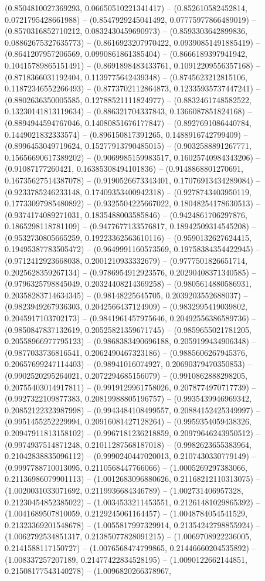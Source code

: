 (0.8504810027369293, 0.06650510221341417) -- (0.852610582452814, 0.0721795428661988) -- (0.8547929245041492, 0.07775977866489019) -- (0.8570316852710212, 0.0832430459690973) -- (0.8593303642899836, 0.08862675327635773) -- (0.8616923207970422, 0.09390851491885419) -- (0.8641207957206569, 0.0990861861385404) -- (0.8666189397941942, 0.10415789865151491) -- (0.8691898483433761, 0.10912209556357168) -- (0.8718366031192404, 0.1139775642439348) -- (0.8745623212815106, 0.11872346552266493) -- (0.8773702112864873, 0.12335935737447241) -- (0.8802636350005585, 0.12788521111824977) -- (0.8832461748582522, 0.13230141813119634) -- (0.886321704337843, 0.1366087851824168) -- (0.8894944594767046, 0.14080851676177847) -- (0.8927691086440784, 0.1449021832333574) -- (0.896150817391265, 0.1488916742799409) -- (0.8996453049719624, 0.15277913790485015) -- (0.9032588891267771, 0.15656690617389202) -- (0.9069985159983517, 0.16025740984343206) -- (0.91087177260421, 0.16385308494101836) -- (0.9148868801270691, 0.16735627514387078) -- (0.9190526673343401, 0.17076913434289084) -- (0.9233785246233148, 0.17409353400942318) -- (0.9278743403950119, 0.17733097985480892) -- (0.9325504225667022, 0.18048254178630513) -- (0.9374174089271031, 0.1835488003585846) -- (0.9424861706297876, 0.1865298118781109) -- (0.9477677133576817, 0.18942509314545208) -- (0.9532730805665259, 0.19223362563610116) -- (0.9590132627624415, 0.19495387783505472) -- (0.9649991160573569, 0.19758384354422945) -- (0.9712412923668038, 0.2001210933332679) -- (0.9777501826651714, 0.2025628359267134) -- (0.9786954912923576, 0.20290408371340585) -- (0.9796325798845049, 0.20324408214369258) -- (0.9805614880586931, 0.20358283714634345) -- (0.98148225645705, 0.2039203552688037) -- (0.9823949267936303, 0.2042566437124909) -- (0.9832995419039802, 0.2045917103702173) -- (0.9841961457975646, 0.20492556386589736) -- (0.9850847837132619, 0.20525821359671745) -- (0.9859655021781205, 0.20558966977795123) -- (0.9868383490696188, 0.2059199434906348) -- (0.9877033736816541, 0.2062490467323186) -- (0.9885606267945376, 0.20657699247114403) -- (0.98941016074927, 0.20690379470350853) -- (0.9902520295264021, 0.2072294685156079) -- (0.9910862888298205, 0.20755403014917811) -- (0.9919129961758026, 0.2078774970717739) -- (0.9927322109877383, 0.20819988805196757) -- (0.9935439946969342, 0.20852122323987998) -- (0.9943484108499557, 0.20884152425349997) -- (0.9951455252229994, 0.20916081427128264) -- (0.9959354059438326, 0.20947911813158102) -- (0.9967181236218859, 0.20979646243950512) -- (0.9974937514871248, 0.21011287568187018) -- (0.9982623655383964, 0.21042838835096112) -- (0.9990240447020013, 0.2107430330779149) -- (0.9997788710013095, 0.2110568447766066) -- (1.0005269297383066, 0.21136986079901113) -- (1.0012683096880626, 0.21168212110313075) -- (1.0020031033071692, 0.2119936684346789) -- (1.002731406957328, 0.21230454852385022) -- (1.0034533211453551, 0.21261481029865392) -- (1.0041689507810059, 0.2129245061164457) -- (1.0048784054541529, 0.21323369201548678) -- (1.0055817997329914, 0.21354242798855924) -- (1.0062792534851317, 0.21385077828091215) -- (1.0069708922236005, 0.2141588117150727) -- (1.0076568474799865, 0.21446660204535892) -- (1.008337257207189, 0.21477422834528195) -- (1.0090122662144851, 0.21508177543140278) -- (1.0096820266378967, 